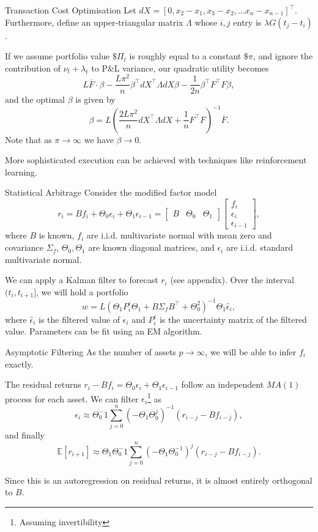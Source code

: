 \documentclass{beamer}
\begin{document}
\begin{frame}{Transaction Cost Optimisation}
	Let $dX = [0,x_2-x_1,x_3-x_2,\ldots x_n-x_{n-1}]^\top$. Furthermore, define an upper-triangular matrix $\Lambda$ whose $i,j$ entry is $\lambda G(t_j-t_i)$.

	If we assume portfolio value $\$\Pi_t$ is roughly equal to a constant $\$\pi$, and ignore the contribution of $\nu_t+\lambda_t$ to P\&L variance, our quadratic utility becomes
	$$L\overline{F} \cdot \beta - \frac{L\pi^2}{n}\beta^\top dX^\top \Lambda dX\beta - \frac{1}{2n}\beta^\top F^\top F\beta,$$
	and the optimal $\beta$ is given by
	$$\beta = L\left(\frac{2L\pi^2}{n} dX^\top \Lambda dX + \frac{1}{n}F^\top F\right)^{-1}\overline{F}.$$
	Note that as $\pi\to\infty$ we have $\beta\to 0$.

	More sophisticated execution can be achieved with techniques like reinforcement learning.
\end{frame}

\begin{frame}{Statistical Arbitrage}
	Consider the modified factor model
	$$r_i = Bf_i + \Theta_0\epsilon_i + \Theta_1\epsilon_{i-1} = \left[\begin{matrix}B & \Theta_0 & \Theta_1\end{matrix}\right]\left[\begin{matrix}f_i \\ \epsilon_i \\ \epsilon_{i-1}\end{matrix}\right],$$
	where $B$ is known, $f_i$ are i.i.d. multivariate normal with mean zero and covariance $\Sigma_f$, $\Theta_0,\Theta_1$ are known diagonal matrices, and $\epsilon_i$ are i.i.d. standard multivariate normal.

	We can apply a Kalman filter to forecast $r_i$ (see appendix). Over the interval $(t_i,t_{i+1}]$, we will hold a portfolio
	$$w = L(\Theta_1 P^\epsilon_i \Theta_1 + B\Sigma_f B^\top + \Theta_0^2)^{-1} \Theta_1\hat{\epsilon}_i,$$
	where $\hat{\epsilon}_i$ is the filtered value of $\epsilon_i$ and $P^\epsilon_i$ is the uncertainty matrix of the filtered value. Parameters can be fit using an EM algorithm.
\end{frame}

\begin{frame}{Asymptotic Filtering}
	As the number of assets $p\to\infty$, we will be able to infer $f_i$ exactly.

	The residual returns $r_i-Bf_i = \Theta_0\epsilon_i + \Theta_1 \epsilon_{i-1}$ follow an independent $MA(1)$ process for each asset. We can filter $\epsilon_i$\footnote{Assuming invertibility} as
	$$\epsilon_i \approx \Theta_0^-1 \sum_{j=0}^n \left(-\Theta_1\Theta_0^j\right)^{-1}(r_{i-j}-Bf_{i-j}),$$
	and finally
	$$\mathbb{E}[r_{i+1}] \approx \Theta_1\Theta_0^-1 \sum_{j=0}^n \left(-\Theta_1\Theta_0^{-1}\right)^j(r_{i-j}-Bf_{i-j}).$$

	Since this is an autoregression on residual returns, it is almost entirely orthogonal to $B$.
\end{frame}
\end{document}
